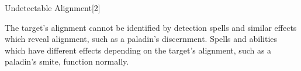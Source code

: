 \begin{spellsection}{Undetectable Alignment}[2]
    \begin{spellheader}
    \end{spellheader}
    \begin{spellcontent}
        \begin{spelltargetinginfo}
            \spellrng{\rngclose}
        \end{spelltargetinginfo}
        \begin{spelleffects}

            \spelleffect The target's alignment cannot be identified by detection spells and similar effects which reveal alignment, such as a paladin's discernment. Spells and abilities which have different effects depending on the target's alignment, such as a paladin's smite, function normally.
            \spelldur \durext \dismissable
        \end{spelleffects}
    \end{spellcontent}
    \begin{spellfooter}
    \end{spellfooter}
\end{spellsection}

